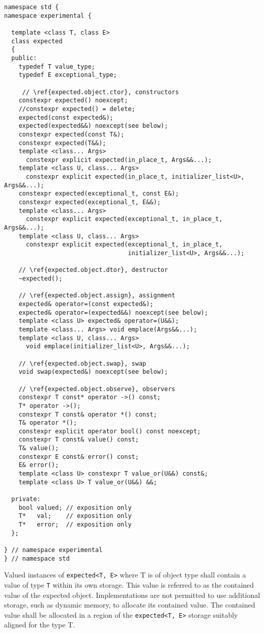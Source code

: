 \documentclass[a4paper,10pt]{article}
\newcommand{\cpp}[1]{\lstinline{#1}}
\begin{document}
\begin{lstlisting}
namespace std {
namespace experimental {

  template <class T, class E>
  class expected
  {
  public:
    typedef T value_type;
    typedef E exceptional_type;
    
     // \ref{expected.object.ctor}, constructors
    constexpr expected() noexcept;
    //constexpr expected() = delete;
    expected(const expected&);
    expected(expected&&) noexcept(see below);
    constexpr expected(const T&);
    constexpr expected(T&&);
    template <class... Args> 
      constexpr explicit expected(in_place_t, Args&&...);
    template <class U, class... Args>
      constexpr explicit expected(in_place_t, initializer_list<U>, Args&&...);
    constexpr expected(exceptional_t, const E&);
    constexpr expected(exceptional_t, E&&);
    template <class... Args> 
      constexpr explicit expected(exceptional_t, in_place_t, Args&&...);
    template <class U, class... Args>
      constexpr explicit expected(exceptional_t, in_place_t,
                                  initializer_list<U>, Args&&...);

    // \ref{expected.object.dtor}, destructor
    ~expected();

    // \ref{expected.object.assign}, assignment
    expected& operator=(const expected&);
    expected& operator=(expected&&) noexcept(see below);
    template <class U> expected& operator=(U&&);
    template <class... Args> void emplace(Args&&...);
    template <class U, class... Args>
      void emplace(initializer_list<U>, Args&&...);

    // \ref{expected.object.swap}, swap
    void swap(expected&) noexcept(see below);

    // \ref{expected.object.observe}, observers
    constexpr T const* operator ->() const;
    T* operator ->();
    constexpr T const& operator *() const;
    T& operator *();
    constexpr explicit operator bool() const noexcept;
    constexpr T const& value() const;
    T& value();
    constexpr E const& error() const;
    E& error();
    template <class U> constexpr T value_or(U&&) const&;
    template <class U> T value_or(U&&) &&;

  private:
    bool valued; // exposition only
    T*   val;    // exposition only
    T*   error;  // exposition only
  };

} // namespace experimental
} // namespace std
\end{lstlisting}


Valued instances of \cpp{expected<T, E>} where T is of object type shall contain a value of type \cpp{T} within its own storage. This value is referred to as the contained value of the expected object. Implementations are not permitted to use additional storage, such as dynamic memory, to allocate its contained value. The contained value shall be allocated in a region of the \cpp{expected<T, E>} storage suitably aligned for the type T.
\newline
\end{document}
